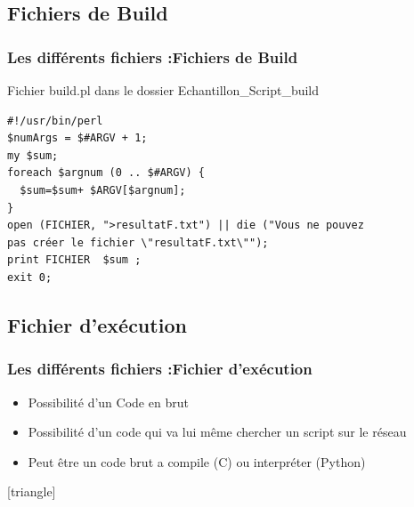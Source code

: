 \documentclass[slidetop,11pt]{beamer}
\begin{document}
\subsection[Fichiers de Build]{Fichiers de Build}
\begin{frame}[label=builds,fragile]
\frametitle{Les différents fichiers :Fichiers de Build}

Fichier build.pl dans le dossier Echantillon\_Script\_build 
\begin{verbatim}
#!/usr/bin/perl
$numArgs = $#ARGV + 1;
my $sum;
foreach $argnum (0 .. $#ARGV) {
  $sum=$sum+ $ARGV[$argnum];
}
open (FICHIER, ">resultatF.txt") || die ("Vous ne pouvez 
pas créer le fichier \"resultatF.txt\"");
print FICHIER  $sum ;
exit 0;
\end{verbatim}

\end{frame}


\subsection[Fichier d'exécution]{Fichier d'exécution}
\begin{frame}[label=exec,fragile]
\frametitle{Les différents fichiers :Fichier d'exécution}

\begin{itemize}
\item Possibilité d'un Code en brut
\item Possibilité d'un code qui va lui même chercher un script sur le réseau 
\item Peut être un code brut a compile (C) ou interpréter (Python)
\end{itemize}
\end{frame}


[triangle]
\end{document}
